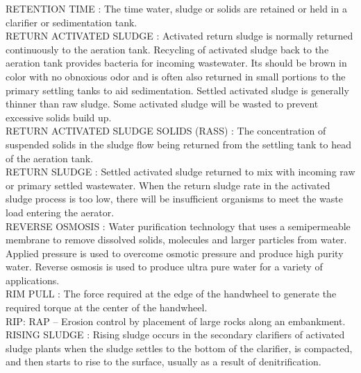 \vspace{0.15cm}
RETENTION TIME :  The time water, sludge or solids are retained or held in a clarifier or sedimentation tank.\\
\vspace{0.15cm}
RETURN ACTIVATED SLUDGE :   Activated return sludge is normally returned continuously to the aeration tank. Recycling of activated sludge back to the aeration tank provides bacteria for incoming wastewater. Its should be brown in color with no obnoxious odor and is often also returned in small portions to the primary settling tanks to aid sedimentation. Settled activated sludge is generally thinner than raw sludge. Some activated sludge will be wasted to prevent excessive solids build up.\\
\vspace{0.15cm}
RETURN ACTIVATED SLUDGE SOLIDS (RASS) :  The concentration of suspended solids in the sludge flow being returned from the settling tank to head of the aeration tank. \\
\vspace{0.15cm}
RETURN SLUDGE :   Settled activated sludge returned to mix with incoming raw or primary settled wastewater. When the return sludge rate in the activated sludge process is too low, there will be insufficient organisms to meet the waste load entering the aerator.\\
\vspace{0.15cm}
REVERSE OSMOSIS :  Water purification technology that uses a semipermeable membrane to remove dissolved solids, molecules and larger particles from water. Applied pressure is used to overcome osmotic pressure and produce high purity water. Reverse osmosis is used to produce ultra pure water for a variety of applications.\\
\vspace{0.15cm}
RIM PULL :   The force required at the edge of the handwheel to generate the required torque at the center of the handwheel.\\
\vspace{0.15cm}
RIP: RAP – Erosion control by placement of large rocks along an embankment.\\
\vspace{0.15cm}
RISING SLUDGE :  Rising sludge occurs in the secondary clarifiers of activated sludge plants when the sludge settles to the bottom of the clarifier, is compacted, and then starts to rise to the surface, usually as a result of denitrification.\\
\vspace{0.15cm}
